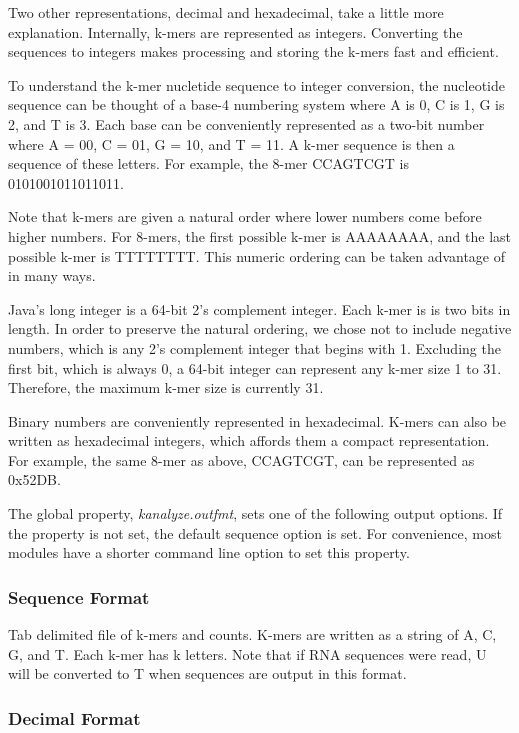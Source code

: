 Two other representations, decimal and hexadecimal, take a little more explanation. Internally, k-mers are represented as integers. Converting the sequences to integers makes processing and storing the k-mers fast and efficient.

To understand the k-mer nucletide sequence to integer conversion, the nucleotide sequence can be thought of a base-4 numbering system where A is 0, C is 1, G is 2, and T is 3. Each base can be conveniently represented as a two-bit number where A = 00, C = 01, G = 10, and T = 11. A k-mer sequence is then a sequence of these letters. For example, the 8-mer CCAGTCGT is 0101001011011011.

Note that k-mers are given a natural order where lower numbers come before higher numbers. For 8-mers, the first possible k-mer is AAAAAAAA, and the last possible k-mer is TTTTTTTT. This numeric ordering can be taken advantage of in many ways.

Java's long integer is a 64-bit 2's complement integer. Each k-mer is is two bits in length. In order to preserve the natural ordering, we chose not to include negative numbers, which is any 2's complement integer that begins with 1. Excluding the first bit, which is always 0, a 64-bit integer can represent any k-mer size 1 to 31. Therefore, the maximum k-mer size is currently 31.

Binary numbers are conveniently represented in hexadecimal. K-mers can also be written as hexadecimal integers, which affords them a compact representation. For example, the same 8-mer as above, CCAGTCGT, can be represented as 0x52DB.

The global property, \emph{kanalyze.outfmt}, sets one of the following output options. If the property is not set, the default sequence option is set. For convenience, most modules have a shorter command line option to set this property.

\subsubsection{Sequence Format}
\label{sec.suppl.outputformat.seq}

Tab delimited file of k-mers and counts. K-mers are written as a string of A, C, G, and T. Each k-mer has k letters. Note that if RNA sequences were read, U will be converted to T when sequences are output in this format.

\subsubsection{Decimal Format}
\label{sec.suppl.outputformat.dec}

